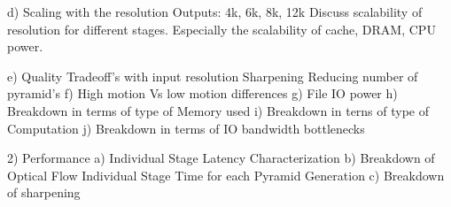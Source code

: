 	d) Scaling with the resolution\newline
			Outputs:
			4k, 6k, 8k, 12k
		Discuss scalability of resolution for different stages. \newline
		Especially the scalability of cache, DRAM, CPU power. 
		

	e) Quality Tradeoff's with input resolution\newline
			Sharpening
			Reducing number of pyramid's
	f) High motion Vs low motion differences
	g) File IO power
	h) Breakdown in terms of type of Memory	used
	i) Breakdown in terns of type of Computation
	j) Breakdown in terms of IO bandwidth bottlenecks
	
	

2) Performance \newline
	a) Individual Stage Latency Characterization
	b) Breakdown of Optical Flow
		Individual Stage
		Time for each Pyramid Generation
	c) Breakdown of sharpening
	

